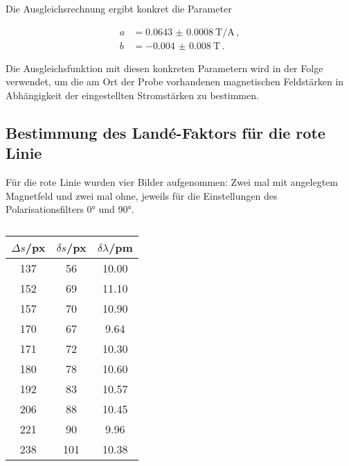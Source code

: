 Die Ausgleichsrechnung ergibt konkret die Parameter

\begin{align}
  a &= \SI{0.0643(8)}{\tesla\per\ampere}\,,\\
  b &= \SI{-0.004(8)}{\tesla}\,.
\end{align}

Die Ausgleichsfunktion mit diesen konkreten Parametern wird in der Folge verwendet, um
die am Ort der Probe vorhandenen magnetischen Feldstärken in Abhängigkeit der eingestellten Stromstärken zu bestimmen.

\subsection{Bestimmung des Landé-Faktors für die rote Linie}

Für die rote Linie wurden vier Bilder aufgenommen: Zwei mal mit angelegtem Magnetfeld und zwei mal ohne, jeweils für die Einstellungen des Polarisationsfilters \ang{0} und \ang{90}.

\begin{table}[htp]
	\begin{center}
    \caption{\cite{insert caption}}
    \label{tab:rot}
		\begin{tabular}{ccc}
		\toprule
			{$\Delta s$/px} & {$\delta s$/px} & {$\delta \lambda$/pm}\\
			\midrule
			137 &  56 & 10.00\\
			152 &  69 & 11.10\\
			157 &  70 & 10.90\\
			170 &  67 &  9.64\\
			171 &  72 & 10.30\\
			180 &  78 & 10.60\\
			192 &  83 & 10.57\\
			206 &  88 & 10.45\\
			221 &  90 &  9.96\\
			238 & 101 & 10.38\\
		\bottomrule
		\end{tabular}
	\end{center}
\end{table}
